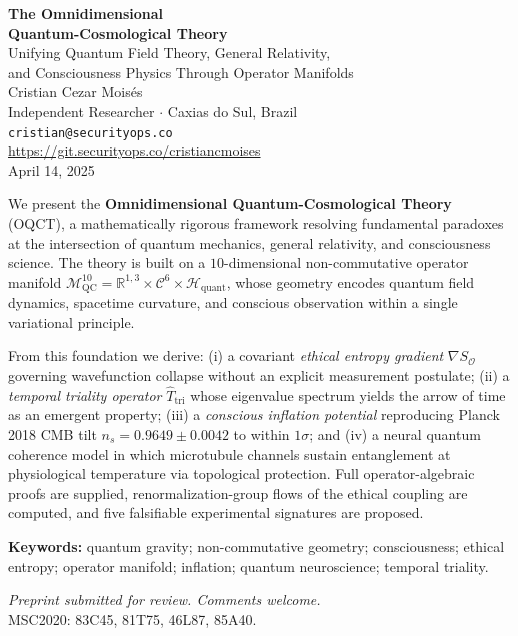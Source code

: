 \documentclass[12pt,a4paper]{article}
\theoremstyle{myrmk}
\newcommand{\Mmanifold}{\mathcal{M}^{10}_{\mathrm{QC}}}
\newcommand{\SO}{\nabla S_{\!\mathcal{O}}}
\newcommand{\cC}{\mathcal{C}^{6}}
\newcommand{\HH}{\mathcal{H}_{\mathrm{quant}}}
\begin{document}
\begin{titlepage}
\centering\vspace*{1.6cm}
{\Huge\bfseries\color{deepblue}
  The Omnidimensional\\[4pt]
  Quantum-Cosmological Theory\\[0.7em]}
{\large\color{cosmicpurple}
  Unifying Quantum Field Theory, General Relativity,\\
  and Consciousness Physics Through Operator Manifolds\\[2.2em]}
{\large Cristian Cezar Mois\'{e}s}\\[0.4em]
{\normalsize Independent Researcher $\cdot$ Caxias do Sul, Brazil}\\[0.3em]
{\small \texttt{cristian@securityops.co}}\\[0.3em]
{\small \url{https://git.securityops.co/cristiancmoises}}\\[2.2em]
{\normalsize April 14, 2025}\\[3em]

\begin{tcolorbox}[colback=lightgray,colframe=deepblue,width=0.92\textwidth,
  title={\color{white}\bfseries Abstract},
  attach boxed title to top left={yshift=-2mm,xshift=4mm},
  boxed title style={colback=deepblue,colframe=deepblue}]
We present the \textbf{Omnidimensional Quantum-Cosmological Theory} (OQCT), a
mathematically rigorous framework resolving fundamental paradoxes at the intersection
of quantum mechanics, general relativity, and consciousness science.
The theory is built on a $10$-dimensional non-commutative operator manifold
$\Mmanifold = \mathbb{R}^{1,3}\times\cC\times\HH$, whose geometry encodes quantum
field dynamics, spacetime curvature, and conscious observation within a single
variational principle.

From this foundation we derive: (i) a covariant \emph{ethical entropy gradient}
$\SO$ governing wavefunction collapse without an explicit measurement postulate;
(ii) a \emph{temporal triality operator} $\hat{T}_{\mathrm{tri}}$ whose eigenvalue
spectrum yields the arrow of time as an emergent property;
(iii) a \emph{conscious inflation potential} reproducing Planck 2018 CMB tilt
$n_s=0.9649\pm0.0042$ to within $1\sigma$; and (iv) a neural quantum coherence model
in which microtubule channels sustain entanglement at physiological temperature via
topological protection. Full operator-algebraic proofs are supplied, renormalization-group
flows of the ethical coupling are computed, and five falsifiable experimental signatures
are proposed.

\smallskip
\noindent\textbf{Keywords:} quantum gravity; non-commutative geometry; consciousness;
ethical entropy; operator manifold; inflation; quantum neuroscience; temporal triality.
\end{tcolorbox}

\vfill
{\small\color{darkgray}\textit{Preprint submitted for review. Comments welcome.}\\
MSC2020: 83C45, 81T75, 46L87, 85A40.}
\end{titlepage}
\end{document}
